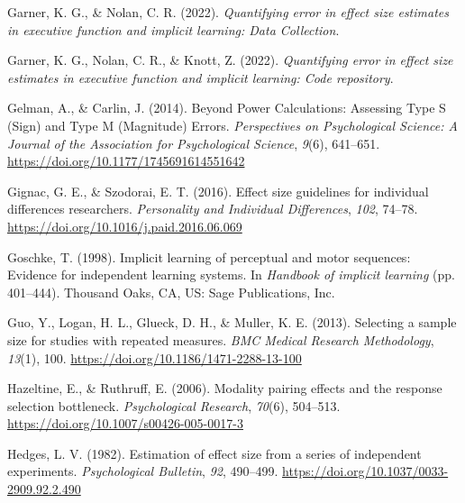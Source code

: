 \documentclass[
  man]{apa6}
\newlength{\cslhangindent}
\newlength{\cslentryspacingunit} %
\newenvironment{CSLReferences}[2] %
 {%
  \setlength{\parindent}{0pt}
  \ifodd #1
  \let\oldpar\par
  \def\par{\hangindent=\cslhangindent\oldpar}
  \fi
  \setlength{\parskip}{#2\cslentryspacingunit}
 }%
 {}
\begin{document}
\begin{CSLReferences}{1}{0}
\leavevmode{}%
Garner, K. G., \& Nolan, C. R. (2022). \emph{Quantifying error in effect size estimates in executive function and implicit learning: {Data Collection}}.

\leavevmode{}%
Garner, K. G., Nolan, C. R., \& Knott, Z. (2022). \emph{Quantifying error in effect size estimates in executive function and implicit learning: {Code} repository}.

\leavevmode{}%
Gelman, A., \& Carlin, J. (2014). Beyond {Power Calculations}: {Assessing Type S} ({Sign}) and {Type M} ({Magnitude}) {Errors}. \emph{Perspectives on Psychological Science: A Journal of the Association for Psychological Science}, \emph{9}(6), 641--651. \url{https://doi.org/10.1177/1745691614551642}

\leavevmode{}%
Gignac, G. E., \& Szodorai, E. T. (2016). Effect size guidelines for individual differences researchers. \emph{Personality and Individual Differences}, \emph{102}, 74--78. \url{https://doi.org/10.1016/j.paid.2016.06.069}

\leavevmode{}%
Goschke, T. (1998). Implicit learning of perceptual and motor sequences: {Evidence} for independent learning systems. In \emph{Handbook of implicit learning} (pp. 401--444). {Thousand Oaks, CA, US}: {Sage Publications, Inc}.

\leavevmode{}%
Guo, Y., Logan, H. L., Glueck, D. H., \& Muller, K. E. (2013). Selecting a sample size for studies with repeated measures. \emph{BMC Medical Research Methodology}, \emph{13}(1), 100. \url{https://doi.org/10.1186/1471-2288-13-100}

\leavevmode{}%
Hazeltine, E., \& Ruthruff, E. (2006). Modality pairing effects and the response selection bottleneck. \emph{Psychological Research}, \emph{70}(6), 504--513. \url{https://doi.org/10.1007/s00426-005-0017-3}

\leavevmode{}%
Hedges, L. V. (1982). Estimation of effect size from a series of independent experiments. \emph{Psychological Bulletin}, \emph{92}, 490--499. \url{https://doi.org/10.1037/0033-2909.92.2.490}


\end{CSLReferences}
\end{document}
